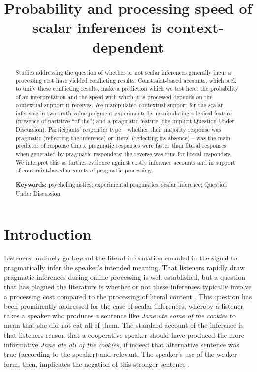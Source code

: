 \documentclass[10pt,letterpaper]{article}
\title{Probability and processing speed of scalar inferences is context-dependent}
\begin{document}
\maketitle


\begin{abstract}

Studies addressing the question of whether or not scalar inferences generally incur a processing cost  have yielded conflicting results. Constraint-based accounts, which seek to unify these conflicting results, make a prediction which we test here: the probability of an interpretation and the speed with which it is processed depends on the contextual support it receives. We manipulated contextual support for the scalar inference in two truth-value judgment experiments  by manipulating a lexical feature (presence of partitive ``of the'') and a pragmatic feature (the implicit Question Under Discussion). Participants' responder type -- whether their majority response was pragmatic (reflecting the inference) or literal (reflecting its absence) -- was the main predictor of response times: pragmatic responses  were faster than literal responses when generated by pragmatic responders; the reverse was true for literal responders. We interpret this as further evidence against costly inference accounts and in support of constraint-based accounts of pragmatic processing.

\textbf{Keywords:} psycholinguistics; experimental pragmatics; scalar inference; Question Under Discussion

\end{abstract}

\section{Introduction}

Listeners routinely go beyond the literal information encoded in the signal to pragmatically infer the speaker's intended meaning. That listeners rapidly draw pragmatic inferences during online processing is well established, but a question that has plagued the literature is whether or not these inferences typically involve a processing cost compared to the processing of literal content \cite{BottNoveck2004,BrehenyEtAl2006,HuangSnedeker2009,HuangSnedeker2011,Grodner2010,Breheny2013,DegenTanenhaus2016,DeNeysSchaeken2007,TomlinsonEtAl2012}. This question has been prominently addressed for the case of scalar inferences, whereby a listener takes a speaker who produces a sentence like \textit{Jane ate some of the cookies} to mean that she did not eat all of them. The standard account of the inference is that listeners reason that a cooperative speaker should have produced the more informative \emph{Jane ate all of the cookies}, if indeed that alternative sentence was true (according to the speaker) and relevant. The speaker's use of the weaker form, then, implicates the negation of this stronger sentence \cite{Grice1975}.
\end{document}
